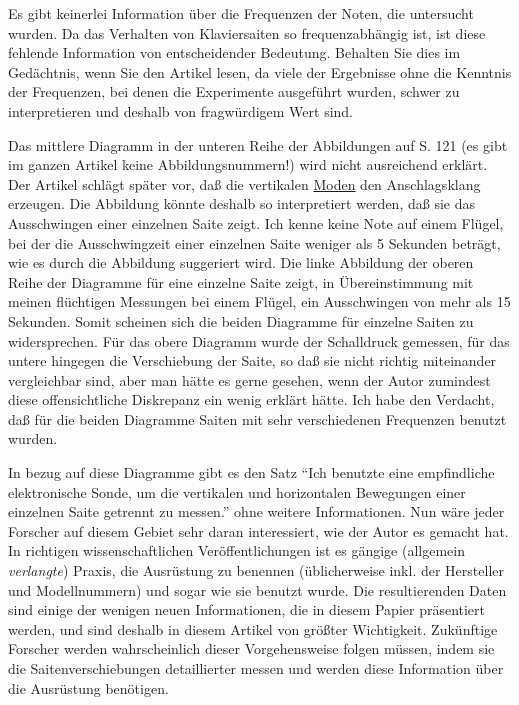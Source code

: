 Es gibt keinerlei Information über die Frequenzen der Noten, die untersucht wurden.
Da das Verhalten von Klaviersaiten so frequenzabhängig ist, ist diese fehlende Information von entscheidender Bedeutung.
Behalten Sie dies im Gedächtnis, wenn Sie den Artikel lesen, da viele der Ergebnisse ohne die Kenntnis der Frequenzen, bei denen die Experimente ausgeführt wurden, schwer zu interpretieren und deshalb von fragwürdigem Wert sind.

Das mittlere Diagramm in der unteren Reihe der Abbildungen auf S. 121 (es gibt im ganzen Artikel keine Abbildungsnummern!) wird nicht ausreichend erklärt.
Der Artikel schlägt später vor, daß die vertikalen \hyperlink{moden}{Moden} den Anschlagsklang erzeugen.
Die Abbildung könnte deshalb so interpretiert werden, daß sie das Ausschwingen einer einzelnen Saite zeigt.
Ich kenne keine Note auf einem Flügel, bei der die Ausschwingzeit einer einzelnen Saite weniger als 5 Sekunden beträgt, wie es durch die Abbildung suggeriert wird.
Die linke Abbildung der oberen Reihe der Diagramme für eine einzelne Saite zeigt, in Übereinstimmung mit meinen flüchtigen Messungen bei einem Flügel, ein Ausschwingen von mehr als 15 Sekunden.
Somit scheinen sich die beiden Diagramme für einzelne Saiten zu widersprechen.
Für das obere Diagramm wurde der Schalldruck gemessen, für das untere hingegen die Verschiebung der Saite, so daß sie nicht richtig miteinander vergleichbar sind, aber man hätte es gerne gesehen, wenn der Autor zumindest diese offensichtliche Diskrepanz ein wenig erklärt hätte.
Ich habe den Verdacht, daß für die beiden Diagramme Saiten mit sehr verschiedenen Frequenzen benutzt wurden.

In bezug auf diese Diagramme gibt es den Satz \enquote{Ich benutzte eine empfindliche elektronische Sonde, um die vertikalen und horizontalen Bewegungen einer einzelnen Saite getrennt zu messen.} ohne weitere Informationen.
Nun wäre jeder Forscher auf diesem Gebiet sehr daran interessiert, wie der Autor es gemacht hat.
In richtigen wissenschaftlichen Veröffentlichungen ist es gängige (allgemein \textit{verlangte}) Praxis, die Ausrüstung zu benennen (üblicherweise inkl. der Hersteller und Modellnummern) und sogar wie sie benutzt wurde.
Die resultierenden Daten sind einige der wenigen neuen Informationen, die in diesem Papier präsentiert werden, und sind deshalb in diesem Artikel von größter Wichtigkeit.
Zukünftige Forscher werden wahrscheinlich dieser Vorgehensweise folgen müssen, indem sie die Saitenverschiebungen detaillierter messen und werden diese Information über die Ausrüstung benötigen.

